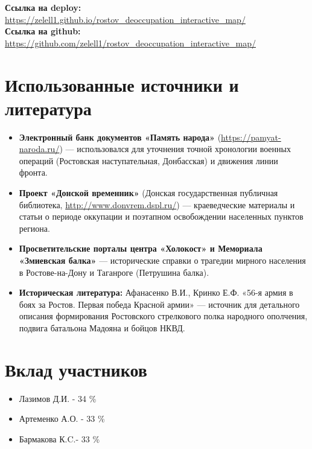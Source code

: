 \documentclass[a4paper,12pt]{article}
\begin{document}
\begin{itemize}
\textbf{Ссылка на deploy:} \url{https://zelell1.github.io/rostov_deoccupation_interactive_map/} \\ 
\textbf{Ссылка на github:} \url{https://github.com/zelell1/rostov_deoccupation_interactive_map/}
\end{itemize}

\section*{Использованные источники и литература}
\begin{itemize}
    \item \textbf{Электронный банк документов «Память народа»} (\url{https://pamyat-naroda.ru/}) — использовался для уточнения точной хронологии военных операций (Ростовская наступательная, Донбасская) и движения линии фронта.
    \item \textbf{Проект «Донской временник»} (Донская государственная публичная библиотека, \url{http://www.donvrem.dspl.ru/}) — краеведческие материалы и статьи о периоде оккупации и поэтапном освобождении населенных пунктов региона.
    \item \textbf{Просветительские порталы центра «Холокост» и Мемориала «Змиевская балка»} — исторические справки о трагедии мирного населения в Ростове-на-Дону и Таганроге (Петрушина балка).
    \item \textbf{Историческая литература:} Афанасенко В.И., Кринко Е.Ф. «56-я армия в боях за Ростов. Первая победа Красной армии» — источник для детального описания формирования Ростовского стрелкового полка народного ополчения, подвига батальона Мадояна и бойцов НКВД.
\end{itemize}

\section*{Вклад участников}

\begin{itemize}
\item  Лазимов Д.И. - 34 \% 
\item  Артеменко А.О. - 33 \% 
\item  Бармакова К.C.- 33 \%
\end{itemize}
\end{document}
